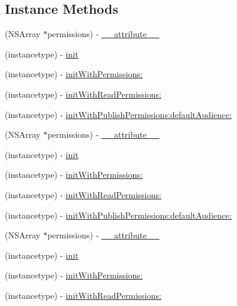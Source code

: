\subsection*{Instance Methods}
\begin{DoxyCompactItemize}
\item 
(N\+S\+Array $\ast$permissions) -\/ \hyperlink{interfaceFBLoginView_aed5ee6aec67e5fd04eed62c4ff09b9f4}{\+\_\+\+\_\+attribute\+\_\+\+\_\+}
\item 
(instancetype) -\/ \hyperlink{interfaceFBLoginView_ae0dfdb97b6ddecbd42bb778b02d3f890}{init}
\item 
(instancetype) -\/ \hyperlink{interfaceFBLoginView_a0fb6885fd07aa64c90378c9abcfd06a4}{init\+With\+Permissions\+:}
\item 
(instancetype) -\/ \hyperlink{interfaceFBLoginView_a1a7bc3cf0ef2b11b1d3c7b6567ad937f}{init\+With\+Read\+Permissions\+:}
\item 
(instancetype) -\/ \hyperlink{interfaceFBLoginView_a937f55736400541dc0f21fe01d6a8b96}{init\+With\+Publish\+Permissions\+:default\+Audience\+:}
\item 
(N\+S\+Array $\ast$permissions) -\/ \hyperlink{interfaceFBLoginView_aed5ee6aec67e5fd04eed62c4ff09b9f4}{\+\_\+\+\_\+attribute\+\_\+\+\_\+}
\item 
(instancetype) -\/ \hyperlink{interfaceFBLoginView_ae0dfdb97b6ddecbd42bb778b02d3f890}{init}
\item 
(instancetype) -\/ \hyperlink{interfaceFBLoginView_a0fb6885fd07aa64c90378c9abcfd06a4}{init\+With\+Permissions\+:}
\item 
(instancetype) -\/ \hyperlink{interfaceFBLoginView_a1a7bc3cf0ef2b11b1d3c7b6567ad937f}{init\+With\+Read\+Permissions\+:}
\item 
(instancetype) -\/ \hyperlink{interfaceFBLoginView_a937f55736400541dc0f21fe01d6a8b96}{init\+With\+Publish\+Permissions\+:default\+Audience\+:}
\item 
(N\+S\+Array $\ast$permissions) -\/ \hyperlink{interfaceFBLoginView_aed5ee6aec67e5fd04eed62c4ff09b9f4}{\+\_\+\+\_\+attribute\+\_\+\+\_\+}
\item 
(instancetype) -\/ \hyperlink{interfaceFBLoginView_ae0dfdb97b6ddecbd42bb778b02d3f890}{init}
\item 
(instancetype) -\/ \hyperlink{interfaceFBLoginView_a0fb6885fd07aa64c90378c9abcfd06a4}{init\+With\+Permissions\+:}
\item 
(instancetype) -\/ \hyperlink{interfaceFBLoginView_a1a7bc3cf0ef2b11b1d3c7b6567ad937f}{init\+With\+Read\+Permissions\+:}
\item 

\end{DoxyCompactItemize}
